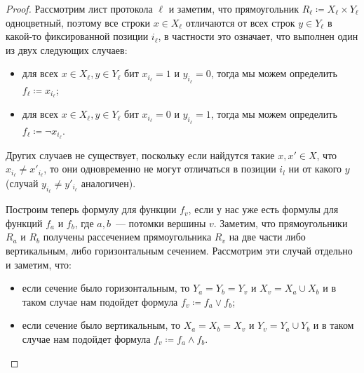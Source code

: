 \begin{proof}
    Рассмотрим лист протокола $\ell$ и заметим, что прямоугольник $R_{\ell} \coloneqq X_{\ell} \times
    Y_{\ell}$ одноцветный, поэтому все строки $x \in X_{\ell}$ отличаются от всех строк $y \in Y_{\ell}$
    в какой-то фиксированной позиции $i_{\ell}$, в частности это означает, что выполнен один из двух
    следующих случаев:
    \begin{itemize}
        \item для всех $x \in X_{\ell}, y \in Y_{\ell}$ бит $x_{i_{\ell}} = 1$ и $y_{i_{\ell}} = 0$,
            тогда мы можем определить $f_{\ell} \coloneqq x_{i_{\ell}}$;
        \item для всех $x \in X_{\ell}, y \in Y_{\ell}$ бит $x_{i_{\ell}} = 0$ и $y_{i_{\ell}} = 1$,
            тогда мы можем определить $f_{\ell} \coloneqq \neg x_{i_{\ell}}$.
    \end{itemize}
    Других случаев не существует, поскольку если найдутся такие $x, x' \in X$, что $x_{i_{\ell}} \neq
    x'_{i_{\ell}}$, то они одновременно не могут отличаться в позиции $i_l$ ни от какого $y$ (случай
    $y_{i_{\ell}} \neq y'_{i_{\ell}}$ аналогичен).

    Построим теперь формулу для функции $f_v$, если у нас уже есть формулы для функций $f_a$ и $f_b$, где
    $a, b$~--- потомки вершины $v$. Заметим, что прямоугольники $R_a$ и $R_b$ получены рассечением
    прямоугольника $R_v$ на две части либо вертикальным, либо горизонтальным сечением. Рассмотрим эти
    случай отдельно и заметим, что:
    \begin{itemize}
        \item если сечение было горизонтальным, то $Y_a = Y_b = Y_v$ и $X_v = X_a \cup X_b$ и в таком
            случае нам подойдет формула $f_v \coloneqq f_a \vee f_b$;
        \item если сечение было вертикальным, то $X_a = X_b = X_v$ и $Y_v = Y_a \cup Y_b$ и в таком
            случае нам подойдет формула $f_v \coloneqq f_a \wedge f_b$.
    \end{itemize}
\end{proof}